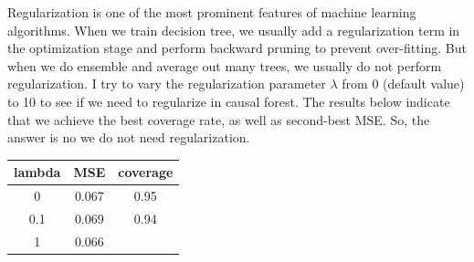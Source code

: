 \documentclass[]{article}
\begin{document}
Regularization is one of the most prominent features of machine learning
algorithms. When we train decision tree, we usually add a regularization
term in the optimization stage and perform backward pruning to prevent
over-fitting. But when we do ensemble and average out many trees, we
usually do not perform regularization. I try to vary the regularization
parameter \(\lambda\) from 0 (default value) to 10 to see if we need to
regularize in causal forest. The results below indicate that we achieve
the best coverage rate, as well as second-best MSE. So, the answer is no
we do not need regularization.

\begin{longtable}[]{@{}ccc@{}}
\toprule
\begin{minipage}[b]{0.11\columnwidth}\centering\strut
lambda\strut
\end{minipage} & \begin{minipage}[b]{0.10\columnwidth}\centering\strut
MSE\strut
\end{minipage} & \begin{minipage}[b]{0.13\columnwidth}\centering\strut
coverage\strut
\end{minipage}\tabularnewline
\midrule
\endhead
\begin{minipage}[t]{0.11\columnwidth}\centering\strut
0\strut
\end{minipage} & \begin{minipage}[t]{0.10\columnwidth}\centering\strut
0.067\strut
\end{minipage} & \begin{minipage}[t]{0.13\columnwidth}\centering\strut
0.95\strut
\end{minipage}\tabularnewline
\begin{minipage}[t]{0.11\columnwidth}\centering\strut
0.1\strut
\end{minipage} & \begin{minipage}[t]{0.10\columnwidth}\centering\strut
0.069\strut
\end{minipage} & \begin{minipage}[t]{0.13\columnwidth}\centering\strut
0.94\strut
\end{minipage}\tabularnewline
\begin{minipage}[t]{0.11\columnwidth}\centering\strut
1\strut
\end{minipage} & \begin{minipage}[t]{0.10\columnwidth}\centering\strut
0.066\strut
\end{minipage} & \begin{minipage}[t]{0.13\columnwidth}\centering\strut

\end{minipage}
\end{longtable}
\end{document}
